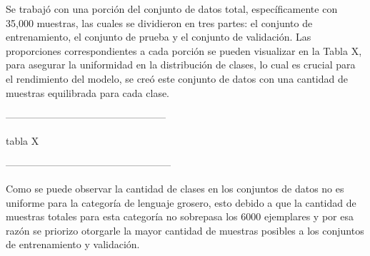Se trabajó con una porción del conjunto de datos total, específicamente con 35,000 muestras, las cuales se dividieron en tres partes: el conjunto de entrenamiento, el conjunto de prueba y el conjunto de validación. Las proporciones correspondientes a cada porción se pueden visualizar en la Tabla X, para asegurar la uniformidad en la distribución de clases, lo cual es crucial para el rendimiento del modelo, se creó este conjunto de datos con una cantidad de muestras equilibrada para cada clase.


------------------------------------------------

tabla X

--------------------------------------------------

Como se puede observar la cantidad de clases en los conjuntos de datos no es uniforme para la categoría de lenguaje grosero, esto debido a que la cantidad de muestras totales para esta categoría no sobrepasa los 6000 ejemplares y por esa razón se priorizo otorgarle la mayor cantidad de muestras posibles a los conjuntos de entrenamiento y validación.